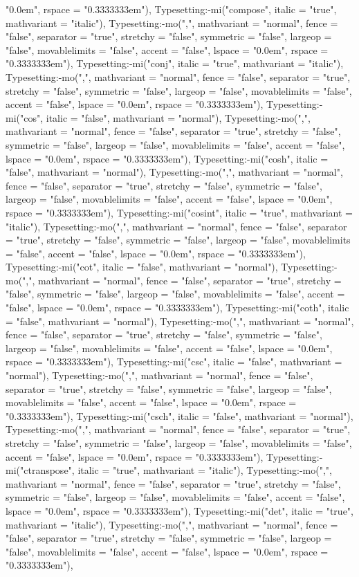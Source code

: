 \documentclass{article}
\begin{document}
{{{\begin{maplegroup}
\begin{maplelatex}
"0.0em", rspace = "0.3333333em"), Typesetting:-mi("compose", italic = "true", mathvariant = "italic"), Typesetting:-mo(",", mathvariant = "normal", fence = "false", separator = "true", stretchy = "false", symmetric = "false", largeop = "false", movablelimits = "false", accent = "false", lspace = "0.0em", rspace = "0.3333333em"), Typesetting:-mi("conj", italic = "true", mathvariant = "italic"), Typesetting:-mo(",", mathvariant = "normal", fence = "false", separator = "true", stretchy = "false", symmetric = "false", largeop = "false", movablelimits = "false", accent = "false", lspace = "0.0em", rspace = "0.3333333em"), Typesetting:-mi("cos", italic = "false", mathvariant = "normal"), Typesetting:-mo(",", mathvariant = "normal", fence = "false", separator = "true", stretchy = "false", symmetric = "false", largeop = "false", movablelimits = "false", accent = "false", lspace = "0.0em", rspace = "0.3333333em"), Typesetting:-mi("cosh", italic = "false", mathvariant = "normal"), Typesetting:-mo(",", mathvariant = "normal", fence = "false", separator = "true", stretchy = "false", symmetric = "false", largeop = "false", movablelimits = "false", accent = "false", lspace = "0.0em", rspace = "0.3333333em"), Typesetting:-mi("cosint", italic = "true", mathvariant = "italic"), Typesetting:-mo(",", mathvariant = "normal", fence = "false", separator = "true", stretchy = "false", symmetric = "false", largeop = "false", movablelimits = "false", accent = "false", lspace = "0.0em", rspace = "0.3333333em"), Typesetting:-mi("cot", italic = "false", mathvariant = "normal"), Typesetting:-mo(",", mathvariant = "normal", fence = "false", separator = "true", stretchy = "false", symmetric = "false", largeop = "false", movablelimits = "false", accent = "false", lspace = "0.0em", rspace = "0.3333333em"), Typesetting:-mi("coth", italic = "false", mathvariant = "normal"), Typesetting:-mo(",", mathvariant = "normal", fence = "false", separator = "true", stretchy = "false", symmetric = "false", largeop = "false", movablelimits = "false", accent = "false", lspace = "0.0em", rspace = "0.3333333em"), Typesetting:-mi("csc", italic = "false", mathvariant = "normal"), Typesetting:-mo(",", mathvariant = "normal", fence = "false", separator = "true", stretchy = "false", symmetric = "false", largeop = "false", movablelimits = "false", accent = "false", lspace = "0.0em", rspace = "0.3333333em"), Typesetting:-mi("csch", italic = "false", mathvariant = "normal"), Typesetting:-mo(",", mathvariant = "normal", fence = "false", separator = "true", stretchy = "false", symmetric = "false", largeop = "false", movablelimits = "false", accent = "false", lspace = "0.0em", rspace = "0.3333333em"), Typesetting:-mi("ctranspose", italic = "true", mathvariant = "italic"), Typesetting:-mo(",", mathvariant = "normal", fence = "false", separator = "true", stretchy = "false", symmetric = "false", largeop = "false", movablelimits = "false", accent = "false", lspace = "0.0em", rspace = "0.3333333em"), Typesetting:-mi("det", italic = "true", mathvariant = "italic"), Typesetting:-mo(",", mathvariant = "normal", fence = "false", separator = "true", stretchy = "false", symmetric = "false", largeop = "false", movablelimits = "false", accent = "false", lspace = "0.0em", rspace = "0.3333333em"), 
\end{maplelatex}
\end{maplegroup}}}}
\end{document}
